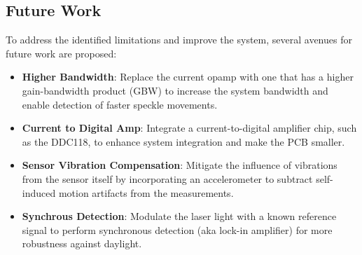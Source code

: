 \subsection{Future Work}
\label{sub:future_work}

To address the identified limitations and improve the system, several avenues for future work are proposed:

\begin{itemize}
    \item \textbf{Higher Bandwidth}: Replace the current opamp with one that has a higher gain-bandwidth product (GBW) to increase the system bandwidth and enable detection of faster speckle movements.
    \item \textbf{Current to Digital Amp}: Integrate a current-to-digital amplifier chip, such as the DDC118, to enhance system integration and make the PCB smaller.
    \item \textbf{Sensor Vibration Compensation}: Mitigate the influence of vibrations from the sensor itself by incorporating an accelerometer to subtract self-induced motion artifacts from the measurements.
    \item \textbf{Synchrous Detection}: Modulate the laser light with a known reference signal to perform synchronous detection (aka lock-in amplifier) for more robustness against daylight.
\end{itemize}